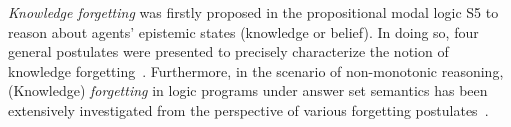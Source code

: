 \documentclass[twoside,11pt]{article}
\begin{document}
{\em Knowledge forgetting} was firstly proposed in the propositional modal logic S5 to reason about agents' epistemic states (knowledge or belief). In doing so, four general postulates were presented to precisely characterize the notion of knowledge forgetting~\cite{Yan:AIJ:2009}.
%
%
Furthermore, in the scenario of non-monotonic reasoning,  (Knowledge) {\em forgetting} in logic programs under answer set semantics has been extensively investigated from the perspective of various forgetting
postulates~\cite{DBLP:Zhang:AIJ2006,DBLP:journals/ai/EiterW08,Wong:PhD:Thesis,Yisong:JAIR,Yisong:IJCAI:2013,DBLP:journals/jair/Delgrande17}.%


\end{document}
